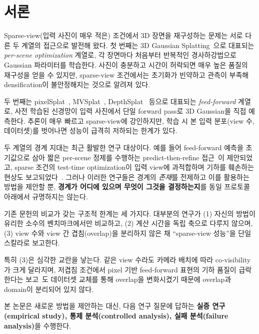 \section{서론}
\label{sec:intro}

Sparse-view(입력 사진이 매우 적은) 조건에서 3D 장면을 재구성하는 문제는 서로 다른 두 계열의 접근으로 발전해 왔다. 첫 번째는 3D Gaussian Splatting~\cite{kerbl20233d}으로 대표되는 \emph{per-scene optimization} 계열로, 각 장면마다 처음부터 반복적인 경사하강법으로 Gaussian 파라미터를 학습한다. 사진이 충분하고 시간이 허락되면 매우 높은 품질의 재구성을 얻을 수 있지만, sparse-view 조건에서는 초기화가 빈약하고 관측이 부족해 densification이 불안정해지는 것으로 알려져 있다.

두 번째는 pixelSplat~\cite{charatan2024pixelsplat}, MVSplat~\cite{chen2024mvsplat}, DepthSplat~\cite{xu2025depthsplat} 등으로 대표되는 \emph{feed-forward} 계열로, 사전 학습된 신경망이 입력 사진에서 단일 forward pass로 3D Gaussian을 직접 예측한다. 추론이 매우 빠르고 sparse-view에 강인하지만, 학습 시 본 입력 분포(view 수, 데이터셋)를 벗어나면 성능이 급격히 저하되는 한계가 있다.

두 계열의 경계 지대는 최근 활발한 연구 대상이다. 예를 들어 feed-forward 예측을 초기값으로 삼아 짧은 per-scene 정제를 수행하는 predict-then-refine 접근~\cite{liu2026diff3r, li2026foresplat}이 제안되었고, sparse 조건의 test-time optimization이 입력 view에 과적합하며 기하를 훼손하는 현상도 보고되었다~\cite{liu2026diff3r}. 그러나 이러한 연구들은 경계의 \emph{존재}를 전제하고 이를 활용하는 방법을 제안할 뿐, \textbf{경계가 어디에 있으며 무엇이 그것을 결정하는지}를 동일 프로토콜 아래에서 규명하지는 않는다.

기존 문헌의 비교가 갖는 구조적 한계는 세 가지다. 대부분의 연구가 (1) 자신의 방법이 유리한 소수의 벤치마크에서만 비교하고, (2) 계산 시간을 독립 축으로 다루지 않으며, (3) view 수와 view 간 겹침(overlap)을 분리하지 않은 채 ``sparse-view 성능''을 단일 스칼라로 보고한다.

특히 (3)은 심각한 교란을 낳는다. 같은 view 수라도 카메라 배치에 따라 co-visibility가 크게 달라지며, 저겹침 조건에서 pixel 기반 feed-forward 표현의 기하 품질이 급락한다는 보고~\cite{wei2025omniscene}도 데이터셋 교체를 통해 overlap을 변화시켰기 때문에 overlap과 domain이 분리되어 있지 않다.

본 논문은 새로운 방법을 제안하는 대신, 다음 연구 질문에 답하는 \textbf{실증 연구(empirical study), 통제 분석(controlled analysis), 실패 분석(failure analysis)}을 수행한다.

